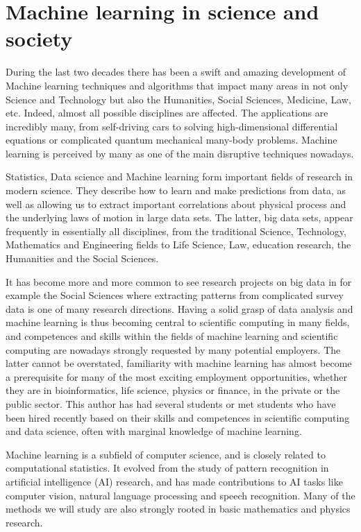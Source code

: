 \documentclass[%
oneside,                 %
final,                   %
10pt]{article}
\begin{document}
\noindent
\section{Machine learning in science and society}

During the last two decades there has been a swift and amazing
development of Machine learning techniques and algorithms that impact
many areas in not only Science and Technology but also the Humanities,
Social Sciences, Medicine, Law, etc. Indeed, almost all possible
disciplines are affected. The applications are incredibly many, from self-driving
cars to solving high-dimensional differential equations or complicated
quantum mechanical many-body problems. Machine learning is perceived
by many as one of the main disruptive techniques nowadays. 

Statistics, Data science and Machine learning form important
fields of research in modern science.  They describe how to learn and
make predictions from data, as well as allowing us to extract
important correlations about physical process and the underlying laws
of motion in large data sets. The latter, big data sets, appear
frequently in essentially all disciplines, from the traditional
Science, Technology, Mathematics and Engineering fields to Life
Science, Law, education research, the Humanities and the Social
Sciences.

It has become more
and more common to see research projects on big data in for example
the Social Sciences where extracting patterns from complicated survey
data is one of many research directions.  Having a solid grasp of data
analysis and machine learning is thus becoming central to scientific
computing in many fields, and competences and skills within the fields
of machine learning and scientific computing are nowadays strongly
requested by many potential employers. The latter cannot be
overstated, familiarity with machine learning has almost become a
prerequisite for many of the most exciting employment opportunities,
whether they are in bioinformatics, life science, physics or finance,
in the private or the public sector. This author has had several
students or met students who have been hired recently based on their
skills and competences in scientific computing and data science, often
with marginal knowledge of machine learning.

Machine learning is a subfield of computer science, and is closely
related to computational statistics.  It evolved from the study of
pattern recognition in artificial intelligence (AI) research, and has
made contributions to AI tasks like computer vision, natural language
processing and speech recognition. Many of the methods we will study are also 
strongly rooted in basic mathematics and physics research. 
\end{document}
